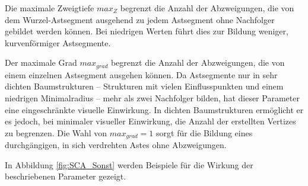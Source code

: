 Die maximale Zweigtiefe $max_Z$ begrenzt die Anzahl der Abzweigungen, die von dem Wurzel-Astsegment ausgehend zu jedem Astsegment ohne Nachfolger gebildet werden können. Bei niedrigen Werten führt dies zur Bildung weniger, kurvenförmiger Astsegmente.

Der maximale Grad $max_{grad}$ begrenzt die Anzahl der Abzweigungen, die von einem einzelnen Astsegment ausgehen können. Da Astsegmente nur in sehr dichten Baumstrukturen -- Strukturen mit vielen Einflusspunkten und einem niedrigen Minimalradius -- mehr als zwei Nachfolger bilden, hat dieser Parameter eine eingeschränkte visuelle Einwirkung. In dichten Baumstrukturen ermöglicht er es jedoch, bei minimaler visueller Einwirkung, die Anzahl der erstellten Vertizes zu begrenzen. Die Wahl von $max_{grad} = 1$ sorgt für die Bildung eines durchgängigen, in sich verdrehten Astes ohne Abzweigungen.

In Abbildung \ref{fig:SCA_Sonst} werden Beispiele für die Wirkung der beschriebenen Parameter gezeigt.

